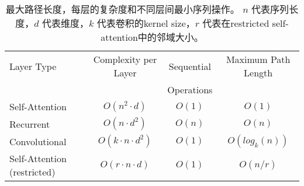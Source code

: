 \documentclass[a4paper,UTF8,no-math]{ctexart}
\begin{document}
\begin{table}[b]
	
	\label{tab:op_complexities}
	\begin{center}
		\vspace{-1mm}
		
		\begin{tabular}{lccc}
			\toprule
			Layer Type & Complexity per Layer & Sequential & Maximum Path Length  \\
			&             & Operations &   \\
			\hline
			\rule{0pt}{2.0ex}Self-Attention & $O(n^2 \cdot d)$ & $O(1)$ & $O(1)$ \\
			Recurrent & $O(n \cdot d^2)$ & $O(n)$ & $O(n)$ \\
			
			Convolutional & $O(k \cdot n \cdot d^2)$ & $O(1)$ & $O(log_k(n))$ \\
			Self-Attention (restricted)& $O(r \cdot n \cdot d)$ & $O(1)$ & $O(n/r)$ \\
			
			
			
			
			
			\bottomrule
		\end{tabular}
	\end{center}
\caption{
	最大路径长度，每层的复杂度和不同层间最小序列操作。 $n$ 代表序列长度，$d$ 代表维度，$k$ 代表卷积的kernel size，$r$ 代表在restricted self-attention中的邻域大小。}
\end{table}


	
	
	
		
\end{document}
